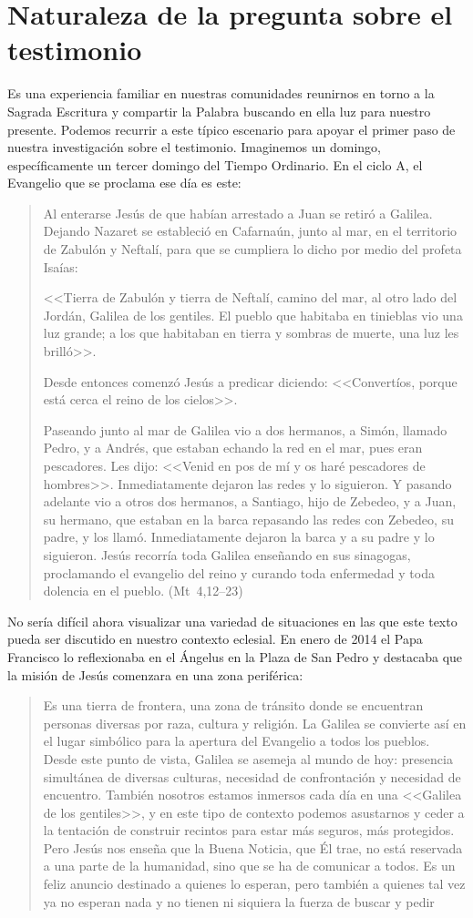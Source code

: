\section{Naturaleza de la pregunta sobre el testimonio}

Es una experiencia familiar en nuestras comunidades reunirnos en torno a la Sagrada Escritura y compartir la Palabra buscando en ella luz para nuestro presente. Podemos recurrir a este típico escenario para apoyar el primer paso de nuestra investigación sobre el testimonio. Imaginemos un domingo, específicamente un tercer domingo del Tiempo Ordinario. En el ciclo A, el Evangelio que se proclama ese día es este:
\blockquote[]{Al enterarse Jesús de que habían arrestado a Juan se retiró a Galilea. Dejando Nazaret se estableció en Cafarnaún, junto al mar, en el territorio de Zabulón y Neftalí, para que se cumpliera lo dicho por medio del profeta Isaías:

<<Tierra de Zabulón y tierra de Neftalí, camino del mar, al otro lado del Jordán, Galilea de los gentiles. El pueblo que habitaba en tinieblas vio una luz grande; a los que habitaban en tierra y sombras de muerte, una luz les brilló>>.

Desde entonces comenzó Jesús a predicar diciendo: <<Convertíos, porque está cerca el reino de los cielos>>.

Paseando junto al mar de Galilea vio a dos hermanos, a Simón, llamado Pedro, y a Andrés, que estaban echando la red en el mar, pues eran pescadores. Les dijo: <<Venid en pos de mí y os haré pescadores de hombres>>. Inmediatamente dejaron las redes y lo siguieron. Y pasando adelante vio a otros dos hermanos, a Santiago, hijo de Zebedeo, y a Juan, su hermano, que estaban en la barca repasando las redes con Zebedeo, su padre, y los llamó. Inmediatamente dejaron la barca y a su padre y lo siguieron. Jesús recorría toda Galilea enseñando en sus sinagogas, proclamando el evangelio del reino y curando toda enfermedad y toda dolencia en el pueblo. (Mt~4,12--23)}

No sería difícil ahora visualizar una variedad de situaciones en las que este texto pueda ser discutido en nuestro contexto eclesial. En enero de 2014 el Papa Francisco lo reflexionaba en el Ángelus en la Plaza de San Pedro y destacaba que la misión de Jesús comenzara en una zona periférica:
\blockquote[{\cite{francisco2014angelus}}]{Es una tierra de frontera, una zona de tránsito donde se encuentran personas diversas por raza, cultura y religión. La Galilea se convierte así en el lugar simbólico para la apertura del Evangelio a todos los pueblos. Desde este punto de vista, Galilea se asemeja al mundo de hoy: presencia simultánea de diversas culturas, necesidad de confrontación y necesidad de encuentro. También nosotros estamos inmersos cada día en una <<Galilea de los gentiles>>, y en este tipo de contexto podemos asustarnos y ceder a la tentación de construir recintos para estar más seguros, más protegidos. Pero Jesús nos enseña que la Buena Noticia, que Él trae, no está reservada a una parte de la humanidad, sino que se ha de comunicar a todos. Es un feliz anuncio destinado a quienes lo esperan, pero también a quienes tal vez ya no esperan nada y no tienen ni siquiera la fuerza de buscar y pedir}.

